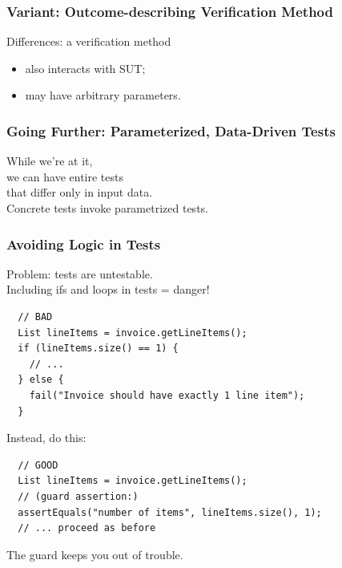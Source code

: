 \documentclass{beamer}
\newenvironment{changemargin}[1]{%
  \begin{list}{}{%
    \setlength{\topsep}{0pt}%
    \setlength{\leftmargin}{#1}%
    \setlength{\rightmargin}{1em}
    \setlength{\listparindent}{\parindent}%
    \setlength{\itemindent}{\parindent}%
    \setlength{\parsep}{\parskip}%
  }%
  \item[]}{\end{list}}
\begin{document}
\begin{frame}
  \frametitle{Variant: Outcome-describing Verification Method}
  \begin{changemargin}{.5cm}
    \small
    
  \end{changemargin}

  \begin{changemargin}{2cm}
    Differences: a verification method
    \begin{itemize}
    \item also interacts with SUT;
      \item may have arbitrary parameters.
    \end{itemize}
  \end{changemargin}
\end{frame}

\begin{frame}
  \frametitle{Going Further: Parameterized, Data-Driven Tests}
  \begin{changemargin}{2cm}
    \Large
    While we're at it,\\
    we can have entire tests \\
    that differ only in input data.\\[1em]
    Concrete tests invoke  parametrized tests.
  \end{changemargin}
\end{frame}

\begin{frame}[fragile]
  \frametitle{Avoiding Logic in Tests}
  \begin{changemargin}{2cm}
    Problem: tests are untestable.\\
    Including ifs and loops in tests = danger!\\
  \end{changemargin}
  {\small
    \begin{lstlisting}
  // BAD
  List lineItems = invoice.getLineItems();
  if (lineItems.size() == 1) {
    // ...
  } else {
    fail("Invoice should have exactly 1 line item");
  }
    \end{lstlisting}
    }
  \begin{changemargin}{2cm}
  Instead, do this:
  \end{changemargin}
      {\small
    \begin{lstlisting}
  // GOOD
  List lineItems = invoice.getLineItems();
  // (guard assertion:)
  assertEquals("number of items", lineItems.size(), 1);
  // ... proceed as before
    \end{lstlisting}
    }
  \begin{changemargin}{2cm}
    The guard keeps you out of trouble.
  \end{changemargin}
\end{frame}
\end{document}
